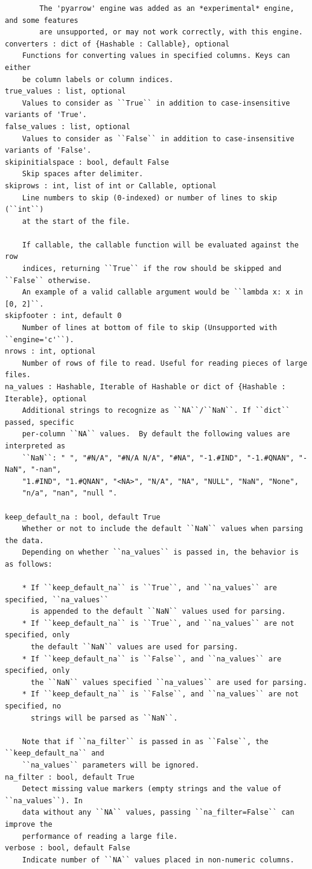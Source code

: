 \documentclass[
  letterpaper,
  DIV=11,
  numbers=noendperiod]{scrreprt}
\begin{document}
\begin{verbatim}
        The 'pyarrow' engine was added as an *experimental* engine, and some features
        are unsupported, or may not work correctly, with this engine.
converters : dict of {Hashable : Callable}, optional
    Functions for converting values in specified columns. Keys can either
    be column labels or column indices.
true_values : list, optional
    Values to consider as ``True`` in addition to case-insensitive variants of 'True'.
false_values : list, optional
    Values to consider as ``False`` in addition to case-insensitive variants of 'False'.
skipinitialspace : bool, default False
    Skip spaces after delimiter.
skiprows : int, list of int or Callable, optional
    Line numbers to skip (0-indexed) or number of lines to skip (``int``)
    at the start of the file.

    If callable, the callable function will be evaluated against the row
    indices, returning ``True`` if the row should be skipped and ``False`` otherwise.
    An example of a valid callable argument would be ``lambda x: x in [0, 2]``.
skipfooter : int, default 0
    Number of lines at bottom of file to skip (Unsupported with ``engine='c'``).
nrows : int, optional
    Number of rows of file to read. Useful for reading pieces of large files.
na_values : Hashable, Iterable of Hashable or dict of {Hashable : Iterable}, optional
    Additional strings to recognize as ``NA``/``NaN``. If ``dict`` passed, specific
    per-column ``NA`` values.  By default the following values are interpreted as
    ``NaN``: " ", "#N/A", "#N/A N/A", "#NA", "-1.#IND", "-1.#QNAN", "-NaN", "-nan",
    "1.#IND", "1.#QNAN", "<NA>", "N/A", "NA", "NULL", "NaN", "None",
    "n/a", "nan", "null ".

keep_default_na : bool, default True
    Whether or not to include the default ``NaN`` values when parsing the data.
    Depending on whether ``na_values`` is passed in, the behavior is as follows:

    * If ``keep_default_na`` is ``True``, and ``na_values`` are specified, ``na_values``
      is appended to the default ``NaN`` values used for parsing.
    * If ``keep_default_na`` is ``True``, and ``na_values`` are not specified, only
      the default ``NaN`` values are used for parsing.
    * If ``keep_default_na`` is ``False``, and ``na_values`` are specified, only
      the ``NaN`` values specified ``na_values`` are used for parsing.
    * If ``keep_default_na`` is ``False``, and ``na_values`` are not specified, no
      strings will be parsed as ``NaN``.

    Note that if ``na_filter`` is passed in as ``False``, the ``keep_default_na`` and
    ``na_values`` parameters will be ignored.
na_filter : bool, default True
    Detect missing value markers (empty strings and the value of ``na_values``). In
    data without any ``NA`` values, passing ``na_filter=False`` can improve the
    performance of reading a large file.
verbose : bool, default False
    Indicate number of ``NA`` values placed in non-numeric columns.


\end{verbatim}
\end{document}
